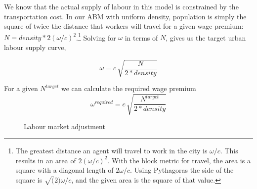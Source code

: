 
We know that the actual supply of labour in this model is constrained by the transportation cost. In our ABM with uniform density, population is simply the square of twice the distance that workers will travel for a given wage premium: $N=density*2(\omega/c)^2$.\footnote{The greatest distance  an agent will travel to work in the city is $\omega/c$. This results in an area of $2(\omega/c)^2$. With the block metric for travel, the area is a square with a diagonal length of $2\omega/c$. Using Pythagoras the side of the square is $\sqrt(2)\omega/c$, and the given area is the square of that value.} %
Solving for $\omega$ in terms of $N$, %
gives us the target urban labour supply curve, 

\begin{equation}
   \omega= c\, \sqrt{\frac{N}{2 * density}}
\label{eqn:Labour-supply}\end{equation}

For a given $N^{target}$ we can calculate the required wage premium
\begin{equation}
   \omega^{required}= c\, \sqrt{\frac{N^{target}}{2 * density}}
\label{eqn:Labour-supply}\end{equation}


\begin{figure}
    \centering
    \caption {Labour market adjustment}
    \label{fig:cobweb}
\end{figure}



